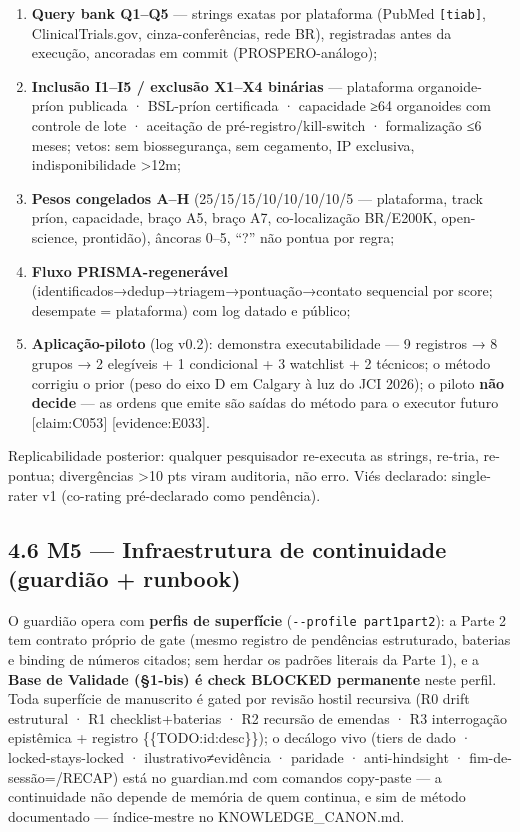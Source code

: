 \documentclass[
  12pt,
]{report}
\providecommand{\tightlist}{%
  \setlength{\itemsep}{0pt}\setlength{\parskip}{0pt}}
\begin{document}
\begin{enumerate}
\def\labelenumi{\arabic{enumi}.}
\tightlist
\item
  \textbf{Query bank Q1--Q5} --- strings exatas por plataforma (PubMed
  \texttt{{[}tiab{]}}, ClinicalTrials.gov, cinza-conferências, rede BR),
  registradas antes da execução, ancoradas em commit (PROSPERO-análogo);
\item
  \textbf{Inclusão I1--I5 / exclusão X1--X4 binárias} --- plataforma
  organoide-príon publicada · BSL-príon certificada · capacidade ≥64
  organoides com controle de lote · aceitação de
  pré-registro/kill-switch · formalização ≤6 meses; vetos: sem
  biossegurança, sem cegamento, IP exclusiva, indisponibilidade
  \textgreater12m;
\item
  \textbf{Pesos congelados A--H} (25/15/15/10/10/10/10/5 --- plataforma,
  track príon, capacidade, braço A5, braço A7, co-localização BR/E200K,
  open-science, prontidão), âncoras 0--5, ``?'' não pontua por regra;
\item
  \textbf{Fluxo PRISMA-regenerável}
  (identificados→dedup→triagem→pontuação→contato sequencial por score;
  desempate = plataforma) com log datado e público;
\item
  \textbf{Aplicação-piloto} (log v0.2): demonstra executabilidade --- 9
  registros → 8 grupos → 2 elegíveis + 1 condicional + 3 watchlist + 2
  técnicos; o método corrigiu o prior (peso do eixo D em Calgary à luz
  do JCI 2026); o piloto \textbf{não decide} --- as ordens que emite são
  saídas do método para o executor futuro {[}claim:C053{]}
  {[}evidence:E033{]}.
\end{enumerate}

Replicabilidade posterior: qualquer pesquisador re-executa as strings,
re-tria, re-pontua; divergências \textgreater10 pts viram auditoria, não
erro. Viés declarado: single-rater v1 (co-rating pré-declarado como
pendência).

\hypertarget{m5-infraestrutura-de-continuidade-guardiuxe3o-runbook}{%
\subsection{4.6 M5 --- Infraestrutura de continuidade (guardião +
runbook)}\label{m5-infraestrutura-de-continuidade-guardiuxe3o-runbook}}

O guardião opera com \textbf{perfis de superfície}
(\texttt{-\/-profile\ part1\textbar{}part2}): a Parte 2 tem contrato
próprio de gate (mesmo registro de pendências estruturado, baterias e
binding de números citados; sem herdar os padrões literais da Parte 1),
e a \textbf{Base de Validade (§1-bis) é check BLOCKED permanente} neste
perfil. Toda superfície de manuscrito é gated por revisão hostil
recursiva (R0 drift estrutural · R1 checklist+baterias · R2 recursão de
emendas · R3 interrogação epistêmica + registro \{\{TODO:id:desc\}\}); o
decálogo vivo (tiers de dado · locked-stays-locked ·
ilustrativo≠evidência · paridade · anti-hindsight ·
fim-de-sessão=/RECAP) está no guardian.md com comandos copy-paste --- a
continuidade não depende de memória de quem continua, e sim de método
documentado --- índice-mestre no KNOWLEDGE\_CANON.md.
\end{document}
